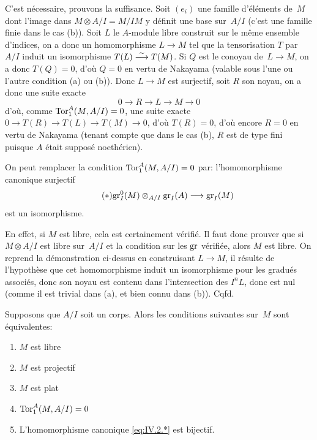 C'est
n\'ecessaire, prouvons la suffisance. Soit $(e_i)$ une famille
d'\'el\'ements de~$M$ dont l'image dans $M \otimes A/I = M/IM$ y
d\'efinit une base sur~$A/I$ (c'est une famille finie dans le cas
(b)). Soit $L$ le $A$-module libre construit sur le m\^eme ensemble
d'indices, on a donc un homomorphisme $L \to M$ tel que la
tensorisation $T$ par $A/I$ induit un isomorphisme $T(L)
\overset{\sim}{\longrightarrow} T(M)$. Si $Q$ est le conoyau de~$L \to M$, on a
donc $T(Q) = 0$, d'o\`u $Q=0$ en vertu de Nakayama (valable sous
l'une ou l'autre condition (a) ou (b)). Donc $L \to M$ est surjectif,
soit $R$ son noyau, on a donc une suite exacte
$$
0 \to R \to L \to M \to 0
$$
d'o\`u, comme $\operatorname{Tor}_1^A(M,A/I)=0$, une suite exacte $0 \to T(R) \to
T(L) \to T(M) \to 0$, d'o\`u $T(R)=0$, d'o\`u encore
$R=0$
en vertu de Nakayama (tenant compte que dans le cas (b), $R$ est de
type fini puisque $A$ \'etait suppos\'e noeth\'erien).

\begin{corollaire}\label{IV.4.2}
On peut remplacer la condition $\operatorname{Tor}_1^A(M,A/I)=0$ par:
l'homomorphisme canonique surjectif
\begin{equation*}
\label{eq:IV.2.*}
\tag{$*$} { \gr_I^0(M) \otimes_{A/I} \gr_I(A) \to \gr_I(M) }
\end{equation*}
est un isomorphisme.
\end{corollaire}

En effet, si $M$ est libre, cela est certainement v\'erifi\'e. Il
faut donc prouver que si $M \otimes A/I$ est libre sur~$A/I$ et la
condition sur les $\operatorname{gr}$ v\'erifi\'ee, alors $M$ est libre. On
reprend la d\'emonstration ci-dessus en construisant $L \to M$, il
r\'esulte de l'hypoth\`ese que cet homomorphisme induit un
isomorphisme pour les gradu\'es associ\'es, donc son noyau est
contenu dans l'intersection des $I^nL$, donc est nul (comme il est
trivial dans (a), et bien connu dans (b)). Cqfd.



\begin{corollaire}
\label{IV.4.3}
Supposons que $A/I$ soit un corps. Alors les conditions suivantes sur~$M$ sont \'equivalentes:
\begin{enumerate}
\item[(i)] $M$ est libre
\item[(ii)] $M$ est projectif
\item[(iii)] $M$ est plat
\item[(iv)] $\operatorname{Tor}_1^A(M, A/I) = 0$
\item[(v)] L'homomorphisme canonique \eqref{eq:IV.2.*} est bijectif.
\end{enumerate}
\end{corollaire}

